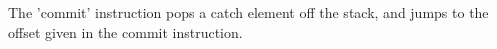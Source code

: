 The 'commit' instruction pops a catch element off the stack,
and jumps to the offset given in the commit instruction.
